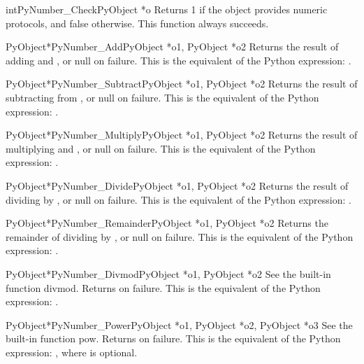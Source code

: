 \documentclass[twoside,openright]{report}
\begin{document}
\begin{cfuncdesc}{int}{PyNumber_Check}{PyObject *o}
Returns 1 if the object  provides numeric protocols, and
false otherwise. 
This function always succeeds.
\end{cfuncdesc}


\begin{cfuncdesc}{PyObject*}{PyNumber_Add}{PyObject *o1, PyObject *o2}
Returns the result of adding  and , or null on failure.
This is the equivalent of the Python expression: .
\end{cfuncdesc}


\begin{cfuncdesc}{PyObject*}{PyNumber_Subtract}{PyObject *o1, PyObject *o2}
Returns the result of subtracting  from , or null on
failure.  This is the equivalent of the Python expression:
.
\end{cfuncdesc}


\begin{cfuncdesc}{PyObject*}{PyNumber_Multiply}{PyObject *o1, PyObject *o2}
Returns the result of multiplying  and , or null on
failure.  This is the equivalent of the Python expression:
.
\end{cfuncdesc}


\begin{cfuncdesc}{PyObject*}{PyNumber_Divide}{PyObject *o1, PyObject *o2}
Returns the result of dividing  by , or null on failure.
This is the equivalent of the Python expression: .
\end{cfuncdesc}


\begin{cfuncdesc}{PyObject*}{PyNumber_Remainder}{PyObject *o1, PyObject *o2}
Returns the remainder of dividing  by , or null on
failure.  This is the equivalent of the Python expression:
.
\end{cfuncdesc}


\begin{cfuncdesc}{PyObject*}{PyNumber_Divmod}{PyObject *o1, PyObject *o2}
See the built-in function divmod.  Returns \NULL{} on failure.
This is the equivalent of the Python expression:
.
\end{cfuncdesc}


\begin{cfuncdesc}{PyObject*}{PyNumber_Power}{PyObject *o1, PyObject *o2, PyObject *o3}
See the built-in function pow.  Returns \NULL{} on failure.
This is the equivalent of the Python expression:
, where  is optional.
\end{cfuncdesc}
\end{document}
